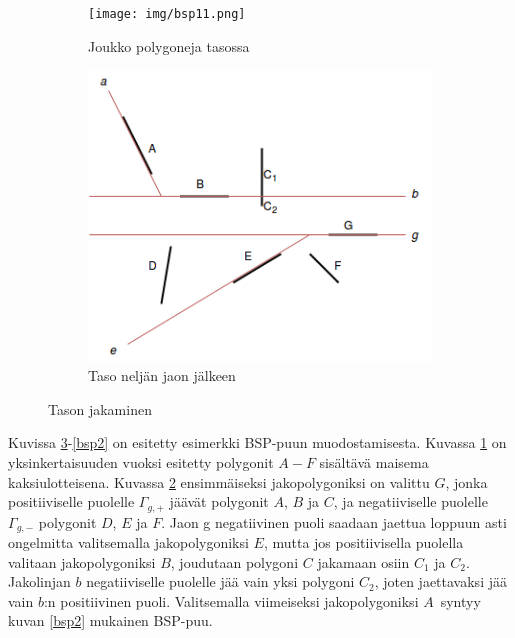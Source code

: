 \documentclass[a4paper, 12pt, titlepage]{article}
\begin{document}
\newpage


\begin{figure}
 \centering
 \begin{subfigure}{0.5\textwidth} 
  \centering
  \texttt{[image: img/bsp11.png]}
  \vspace{0.75cm}
  \caption{Joukko polygoneja tasossa}
  \label{bsp11}
 \end{subfigure}%
 \begin{subfigure}{0.5\textwidth} 
  \centering
  \includegraphics[width=0.9\linewidth]{img/bsp12.png}
  \caption{Taso neljän jaon jälkeen}
  \label{bsp12}
 \end{subfigure}
 \caption{Tason jakaminen}
 \label{bsp1}
\end{figure}

Kuvissa \ref{bsp1}-\ref{bsp2} on esitetty esimerkki BSP-puun muodostamisesta. Kuvassa \ref{bsp11} on yksinkertaisuuden vuoksi esitetty polygonit $A-F$ sisältävä maisema kaksiulotteisena. Kuvassa \ref{bsp12} ensimmäiseksi jakopolygoniksi on valittu $G$, jonka positiiviselle puolelle $\Gamma_{g,+}$ jäävät polygonit $A$, $B$ ja $C$, ja negatiiviselle puolelle $\Gamma_{g,-}$ polygonit $D$, $E$ ja $F$. Jaon g negatiivinen puoli saadaan jaettua loppuun asti ongelmitta valitsemalla jakopolygoniksi $E$, mutta jos positiivisella puolella valitaan jakopolygoniksi $B$, joudutaan polygoni $C$ jakamaan osiin $C_1$ ja $C_2$. Jakolinjan $b$ negatiiviselle puolelle jää vain yksi polygoni $C_2$, joten jaettavaksi jää vain $b$:n positiivinen puoli. Valitsemalla viimeiseksi jakopolygoniksi $A$ syntyy kuvan \ref{bsp2} mukainen BSP-puu.\\
\end{document}
